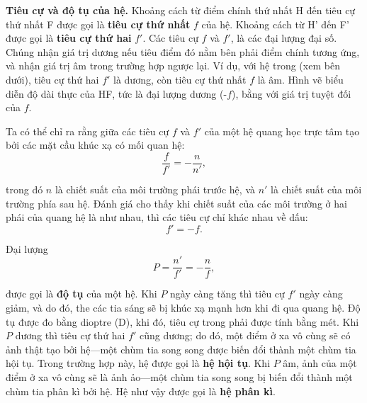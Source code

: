 \textbf{Tiêu cự và độ tụ của hệ.}
Khoảng cách từ điểm chính thứ nhất H đến tiêu cự thứ nhất F được gọi là \textbf{tiêu cự thứ nhất} $f$ của hệ.
Khoảng cách từ H' đến F' được gọi là \textbf{tiêu cự thứ hai} $f'$.
Các tiêu cự $f$ và $f'$, là các đại lượng đại số.
Chúng nhận giá trị dương nếu tiêu điểm đó nằm bên phải điểm chính tương ứng, và nhận giá trị âm trong trường hợp ngược lại.
Ví dụ, với hệ trong  (xem bên dưới), tiêu cự thứ hai $f'$ là dương, còn tiêu cự thứ nhất $f$ là âm.
Hình vẽ biểu diễn độ dài thực của HF, tức là đại lượng dương (-$f$), bằng với giá trị tuyệt đối của $f$.

Ta có thể chỉ ra rằng giữa các tiêu cự $f$ và $f'$ của một hệ quang học trực tâm tạo bởi các mặt cầu khúc xạ có mối quan hệ:
\vspace{-12pt}
\begin{equation}\label{eq:16_57}
    \frac{f}{f'} = -\frac{n}{n'},
\end{equation}

\noindent
trong đó $n$ là chiết suất của môi trường phái trước hệ, và $n'$ là chiết suất của môi trường phía sau hệ.
Đánh giá  cho thấy khi chiết suất của các môi trường ở hai phái của quang hệ là như nhau, thì các tiêu cự chỉ khác nhau về dấu:
\begin{equation}\label{eq:16_58}
    f' = -f.
\end{equation}

Đại lượng
\begin{equation}\label{eq:16_59}
    P = \frac{n'}{f'} = - \frac{n}{f},
\end{equation}

\noindent
được gọi là \textbf{độ tụ} của một hệ.
Khi $P$ ngày càng tăng thì tiêu cự $f'$ ngày càng giảm, và do đó, the các tia sáng sẽ bị khúc xạ mạnh hơn khi đi qua quang hệ.
Độ tụ được đo bằng dioptre (D), khi đó, tiêu cự trong  phải được tính bằng mét.
Khi $P$ dương thì tiêu cự thứ hai $f'$ cũng dương; do đó, một điểm ở xa vô cùng sẽ có ảnh thật tạo bởi hệ---một chùm tia song song được biến đổi thành một chùm tia hội tụ.
Trong trường hợp này, hệ được gọi là \textbf{hệ hội tụ}.
Khi $P$ âm, ảnh của một điểm ở xa vô cùng sẽ là ảnh ảo---một chùm tia song song bị biến đổi thành một chùm tia phân kì bởi hệ. Hệ như vậy được gọi là \textbf{hệ phân kì}.

